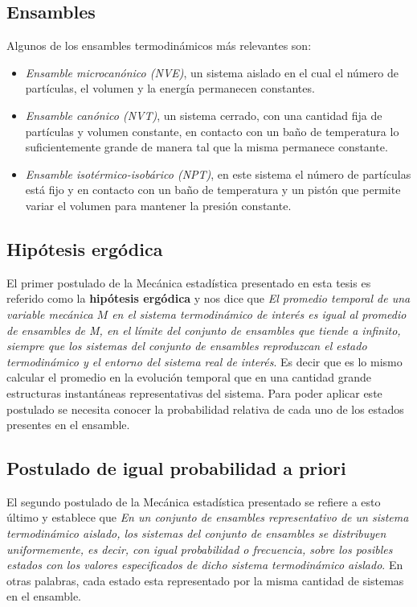 \subsection{Ensambles}

Algunos de los ensambles termodinámicos más relevantes son:
\begin{itemize}
    \item \textit{Ensamble microcanónico (NVE)}, un sistema aislado en el cual el 
        número de partículas, el volumen y la energía permanecen constantes.
    \item \textit{Ensamble canónico (NVT)}, un sistema cerrado, con una cantidad
        fija de partículas y volumen constante, en contacto con un baño de 
        temperatura lo suficientemente grande de manera tal que la misma permanece 
        constante.
    \item \textit{Ensamble isotérmico-isobárico (NPT)}, en este sistema el número
        de partículas está fijo y en contacto con un baño de temperatura y un
        pistón que permite variar el volumen para mantener la presión constante.
\end{itemize}

\subsection{Hipótesis ergódica}

El primer postulado de la Mecánica estadística presentado en esta tesis es 
referido como la \textbf{hipótesis ergódica} y nos dice que \textit{El promedio 
temporal de una variable mecánica $M$ en el sistema termodinámico de interés es 
igual al promedio de ensambles de M, en el límite del conjunto de ensambles que 
tiende a infinito, siempre que los sistemas del conjunto de ensambles reproduzcan 
el estado termodinámico y el entorno del sistema real de interés}. Es decir que
es lo mismo calcular el promedio en la evolución temporal que en una cantidad 
grande estructuras instantáneas representativas del sistema. Para poder aplicar
este postulado se necesita conocer la probabilidad relativa de cada uno de los 
estados presentes en el ensamble.

\subsection{Postulado de igual probabilidad a priori}

El segundo postulado de la Mecánica estadística presentado se refiere a esto
último y establece que \textit{En un conjunto de ensambles representativo de un 
sistema termodinámico aislado, los sistemas del conjunto de ensambles se distribuyen 
uniformemente, es decir, con igual probabilidad o frecuencia, sobre los posibles 
estados con los valores especificados de dicho sistema termodinámico aislado}.
En otras palabras, cada estado esta representado por la misma cantidad de sistemas
en el ensamble.

